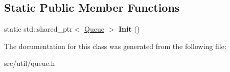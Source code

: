 \subsection*{Static Public Member Functions}
\begin{DoxyCompactItemize}
\item 
static std\+::shared\+\_\+ptr$<$ \hyperlink{classlog2hdfs_1_1Queue}{Queue} $>$ {\bfseries Init} ()\hypertarget{classlog2hdfs_1_1Queue_a45b20819d224f86cd43e85a38c2a4a3c}{}\label{classlog2hdfs_1_1Queue_a45b20819d224f86cd43e85a38c2a4a3c}

\end{DoxyCompactItemize}


The documentation for this class was generated from the following file\+:\begin{DoxyCompactItemize}
\item 
src/util/queue.\+h\end{DoxyCompactItemize}
